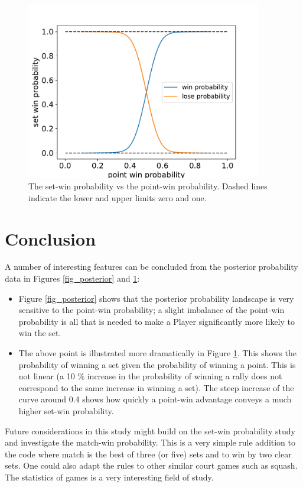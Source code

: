 \documentclass[10pt]{article}
\begin{document}
\begin{figure}
\centering
\includegraphics[width=0.92\textwidth]{fig_prob_point_set.pdf}
    \caption{The set-win probability vs the point-win probability. Dashed lines indicate the lower and upper limits zero and one. }
    \label{fig_point_set_win}
\end{figure}


\section{Conclusion}

A number of interesting features can be concluded from the posterior probability data in Figures \ref{fig_posterior} and \ref{fig_point_set_win}:

\begin{itemize}

\item Figure \ref{fig_posterior} shows that the posterior probability landscape is very sensitive to the point-win probability; a slight imbalance of the point-win probability is all that is needed to make a Player significantly more likely to win the set.

\item The above point is illustrated more dramatically in Figure \ref{fig_point_set_win}. This shows the probability of winning a set given the probability of winning a point. This is not linear (a 10 \% increase in the probability of winning a rally does not correspond to the same increase in winning a set). The steep increase of the curve around 0.4 shows how quickly a point-win advantage conveys a much higher set-win probability.

\end{itemize}


Future considerations in this study might build on the set-win probability study and investigate the match-win probability. This is a very simple rule addition to the code where match is the best of three (or five) sets and to win by two clear sets. One could also adapt the rules to other similar court games such as squash. The statistics of games is a very interesting field of study.
\end{document}
